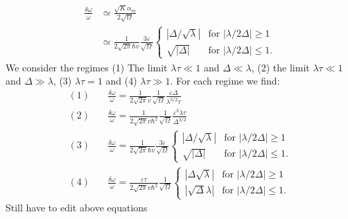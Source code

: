 \begin{align}
    \frac{\delta\omega}{\omega} &\simeq \frac{\sqrt{K}\alpha_m}{2\sqrt{\Omega}}\nonumber\\
    &\simeq\frac{1}{2\sqrt{2\pi}\hbar v}\frac{3\varepsilon}{\sqrt{\Omega}} \begin{cases}
    |\Delta/\sqrt{\lambda}| & \text{for } |\lambda/2\Delta| \geq 1 \\
    \sqrt{|\Delta|} & \text{for } |\lambda/2\Delta| \leq 1.
    \end{cases}
    \label{eq:freq}
\end{align}
We consider the regimes (1) The limit $\lambda\tau\ll1$ and $\Delta\ll\lambda$, (2) the limit $\lambda\tau\ll1$ and $\Delta\gg\lambda$, (3) $\lambda\tau=1$ and (4) $\lambda\tau\gg1$. For each regime we find:
\begin{align}
    (1)&\quad \frac{\delta\omega}{\omega}= \frac{1}{2\sqrt{2\pi} v}\frac{1}{\sqrt{\Omega}}\frac{\varepsilon\Delta}{\lambda^{3/2}\tau}\\
    (2)&\quad \frac{\delta\omega}{\omega}= \frac{1}{2\sqrt{2\pi} v\hbar^2}\frac{1}{\sqrt{\Omega}}\frac{\varepsilon^3\lambda\tau}{\Delta^{3/2}}\\
    (3)&\quad \frac{\delta\omega}{\omega}= \frac{1}{2\sqrt{2\pi}\hbar v}\frac{3\varepsilon}{\sqrt{\Omega}} \begin{cases}
    |\Delta/\sqrt{\lambda}| & \text{for } |\lambda/2\Delta| \geq 1 \\
    \sqrt{|\Delta|} & \text{for } |\lambda/2\Delta| \leq 1.
    \end{cases}\\
    (4)&\quad \frac{\delta\omega}{\omega}= \frac{\varepsilon\tau}{2\sqrt{2\pi} v\hbar^2}\frac{1}{\sqrt{\Omega}}
    \begin{cases}
    |\Delta\sqrt{\lambda}| & \text{for } |\lambda/2\Delta| \geq 1 \\
    |\sqrt{\Delta}\lambda| & \text{for } |\lambda/2\Delta| \leq 1.
    \end{cases} 
\end{align}
{\color{blue} Still have to edit above equations}

